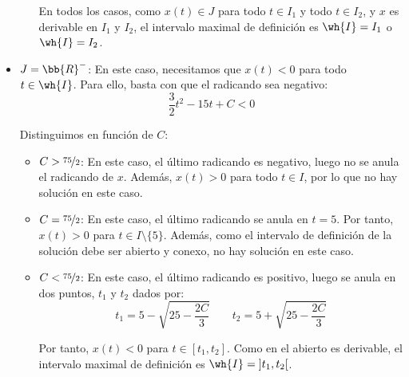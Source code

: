 \begin{ejercicio}
\begin{itemize}
\begin{itemize}
            En todos los casos, como $x(t)\in J$ para todo $t\in I_1$ y todo $t\in I_2$, y $x$ es derivable en $I_1$ y $I_2$, el intervalo maximal de definición es $\wh{I}=I_1$ o $\wh{I}=I_2$.
        \end{itemize}
        
        \item \ul{$J=\bb{R}^-$}: En este caso, necesitamos que $x(t)<0$ para todo $t\in \wh{I}$. Para ello, basta con que el radicando sea negativo:
        \begin{equation*}
            \dfrac{3}{2}t^2 - 15t + C < 0
        \end{equation*}

        Distinguimos en función de $C$:
        \begin{itemize}
            \item \ul{$C>\nicefrac{75}{2}$}: En este caso, el último radicando es negativo, luego no se anula el radicando de $x$. Además, $x(t)>0$ para todo $t\in I$, por lo que no hay solución en este caso.
            
            \item \ul{$C=\nicefrac{75}{2}$}: En este caso, el último radicando se anula en $t=5$. Por tanto, $x(t)>0$ para $t\in I\setminus \{5\}$. Además, como el intervalo de definición de la solución debe ser abierto y conexo, no hay solución en este caso.

            \item \ul{$C<\nicefrac{75}{2}$}: En este caso, el último radicando es positivo, luego se anula en dos puntos, $t_1$ y $t_2$ dados por:
            \begin{equation*}
                t_1 = 5-\sqrt{25-\dfrac{2C}{3}} \qquad t_2 = 5+\sqrt{25-\dfrac{2C}{3}}
            \end{equation*}

            Por tanto, $x(t)<0$ para $t\in [t_1,t_2]$. Como en el abierto es derivable, el intervalo maximal de definición es $\wh{I}=\left]t_1,t_2\right[$.
        \end{itemize}
    \end{itemize}


\end{ejercicio}

